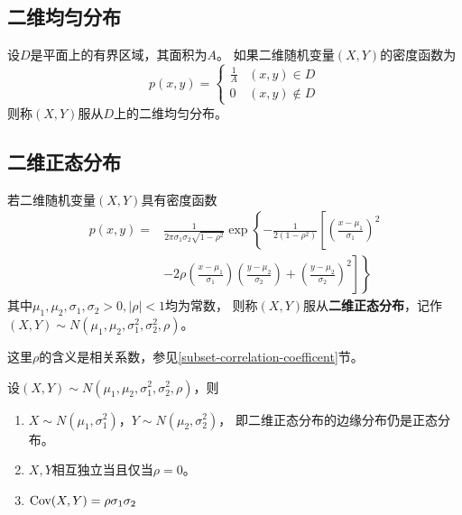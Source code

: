\subsection{二维均匀分布}
\begin{definition}[二维均匀分布]
  设$D$是平面上的有界区域，其面积为$A$。
  如果二维随机变量$(X,Y)$的密度函数为
  \begin{displaymath}
    p(x,y) = \begin{cases}
      \frac{1}{A} & (x,y)\in D \\
      0 & (x,y)\notin D
    \end{cases}
  \end{displaymath}
  则称$(X,Y)$服从$D$上的二维均匀分布。
\end{definition}

\subsection{二维正态分布}
\begin{definition}[二维正态分布]
  若二维随机变量$(X,Y)$具有密度函数
  \begin{align*}
    p(x,y)=&\frac{1}{2\pi\sigma_1\sigma_2\sqrt{1-\rho^2}}
      \exp\left\{-\frac{1}{2(1-\rho^2)}\left[
        \left(\frac{x-\mu_1}{\sigma_1}\right)^2\right.\right.\\
        &\left.\left.-2\rho\left(\frac{x-\mu_1}{\sigma_1}\right)
          \left(\frac{y-\mu_2}{\sigma_2}\right)
        +\left(\frac{y-\mu_2}{\sigma_2}\right)^2\right]\right\}
  \end{align*}
  其中$\mu_1,\mu_2,\sigma_1,\sigma_2 > 0, |\rho| < 1$均为常数，
  则称$(X,Y)$服从\textbf{二维正态分布}，记作
  $(X,Y)\sim N(\mu_1,\mu_2,\sigma_1^2,\sigma_2^2,\rho)$。
\end{definition}

\begin{remark}
  这里$\rho$的含义是相关系数，参见\ref{subset-correlation-coefficent}节。
\end{remark}

\begin{theorem}[二维正态分布的性质]
  设$(X,Y)\sim N(\mu_1,\mu_2,\sigma_1^2,\sigma_2^2,\rho)$，则
  \begin{enumerate}
    \item
    $X\sim N(\mu_1,\sigma_1^2)$，$Y\sim N(\mu_2,\sigma_2^2)$，
    即二维正态分布的边缘分布仍是正态分布。
    \item
    $X,Y$相互独立当且仅当$\rho = 0$。
    \item
    $\textrm{Cov}(X,Y) = \rho\sigma_1\sigma_2$
  \end{enumerate}
\end{theorem}
